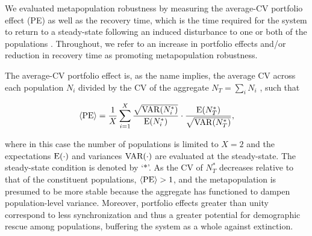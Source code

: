 \documentclass{revtex4}
\begin{document}
\noindent We evaluated metapopulation robustness by measuring the average-CV portfolio effect (PE) \citep{Anderson:2014cx,Schindler:2015gf} as well as the recovery time, which is the time required for the system to return to a steady-state following an induced disturbance to one or both of the populations \citep{Ovaskainen:2002il}.
Throughout, we refer to an increase in portfolio effects and/or reduction in recovery time as promoting metapopulation robustness.

The average-CV portfolio effect is, as the name implies, the average CV across each population $N_i$ divided by the CV of the aggregate $N_T=\sum_i N_i$ \citep{Anderson:2013gb}, such that


\begin{equation}
\langle{\rm PE}\rangle =\frac{1}{X}\sum_{i=1}^{X} \frac{\sqrt{{\rm VAR}(N_i^*)}}{{\rm E}(N_i^*)}\cdot \frac{{\rm E}(N_T^*)}{\sqrt{{\rm VAR}(N_T^*)}},
\label{eq:pe}
\end{equation}

\noindent where in this case the number of populations is limited to $X=2$ and the expectations $\rm E(\cdot)$ and variances $\rm VAR(\cdot)$ are evaluated at the steady-state.
The steady-state condition is denoted by `$*$'.
As the CV of $N_T^*$ decreases relative to that of the constituent populations, $\langle{\rm PE}\rangle > 1$, and the metapopulation is presumed to be more stable because the aggregate has functioned to dampen population-level variance.
Moreover, portfolio effects greater than unity correspond to less synchronization  \citep{Loreau:2008ju,Anderson:2014cx,Yeakel:2013vz} and thus a greater potential for demographic rescue among populations, buffering the system as a whole against extinction. 
\end{document}

